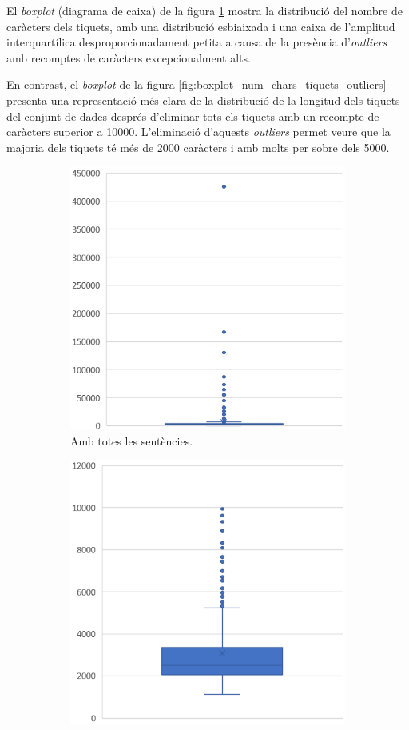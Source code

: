 El \textit{boxplot} (diagrama de caixa) de la figura \ref{fig:boxplot_num_chars_tiquets} mostra la distribució del nombre de caràcters dels tiquets, amb una distribució esbiaixada i una caixa de l'amplitud interquartílica desproporcionadament petita a causa de la presència d'\textit{outliers} amb recomptes de caràcters excepcionalment alts.

En contrast, el \textit{boxplot} de la figura \ref{fig:boxplot_num_chars_tiquets_outliers} presenta una representació més clara de la distribució de la longitud dels tiquets del conjunt de dades després d'eliminar tots els tiquets amb un recompte de caràcters superior a 10000. L'eliminació d'aquests \textit{outliers} permet veure que la majoria dels tiquets té més de 2000 caràcters i amb molts per sobre dels 5000.

\begin{figure}[H]
    \centering
    \begin{subfigure}{.5\textwidth}
      \centering
      \includegraphics[width=.7\linewidth]{boxplot_num_chars_tiquets.png}
      \caption{Amb totes les sentències.}
      \label{fig:boxplot_num_chars_tiquets}
    \end{subfigure}%
    \begin{subfigure}{.5\textwidth}
      \centering
      \includegraphics[width=.7\linewidth]{boxplot_num_chars_tiquets_outliers.png}

\end{subfigure}
\end{figure}
